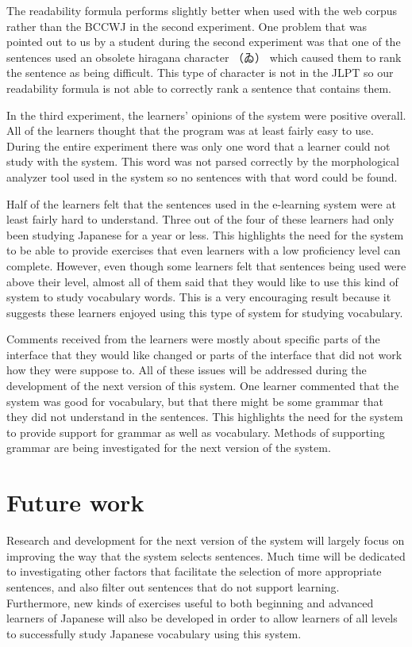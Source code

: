 \documentclass[english]{jnlp_1.4}
\begin{document}
The readability formula performs slightly better when used with the web corpus rather than the BCCWJ in the second experiment. One problem that was pointed out to us by a student during the second experiment was that one of the sentences used an obsolete hiragana character （ゐ） which caused them to rank the sentence as being difficult. This type of character is not in the JLPT so our readability formula is not able to correctly rank a sentence that contains them.

In the third experiment, the learners' opinions of the system were positive overall. All of the learners thought that the program was at least fairly easy to use. During the entire experiment there was only one word that a learner could not study with the system. This word was not parsed correctly by the morphological analyzer tool used in the system so no sentences with that word could be found.

Half of the learners felt that the sentences used in the e-learning system were at least fairly hard to understand. Three out of the four of these learners had only been studying Japanese for a year or less. This highlights the need for the system to be able to provide exercises that even learners with a low proficiency level can complete. However, even though some learners felt that sentences being used were above their level, almost all of them said that they would like to use this kind of system to study vocabulary words. This is a very encouraging result because it suggests these learners enjoyed using this type of system for studying vocabulary.

Comments received from the learners were mostly about specific parts of the interface that they would like changed or parts of the interface that did not work how they were suppose to. All of these issues will be addressed during the development of the next version of this system. One learner commented that the system was good for vocabulary, but that there might be some grammar that they did not understand in the sentences. This highlights the need for the system to provide support for grammar as well as vocabulary. Methods of supporting grammar are being investigated for the next version of the system.


\section{Future work}

Research and development for the next version of the system will largely focus on improving the way that the system selects sentences. Much time will be dedicated to investigating other factors that facilitate the selection of more appropriate sentences, and also filter out sentences that do not support learning. Furthermore, new kinds of exercises useful to both beginning and advanced learners of Japanese will also be developed in order to allow learners of all levels to successfully study Japanese vocabulary using this system.
\end{document}
